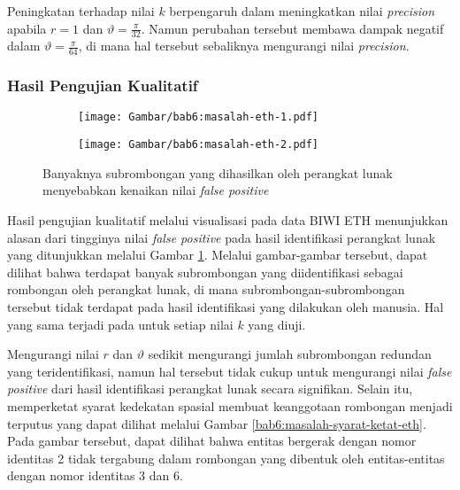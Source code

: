 Peningkatan terhadap nilai $k$ berpengaruh dalam meningkatkan nilai \textit{precision} apabila $r = 1$ dan $\vartheta = \frac{\pi}{32}$. Namun perubahan tersebut membawa dampak negatif dalam $\vartheta = \frac{\pi}{64}$, di mana hal tersebut sebaliknya mengurangi nilai \textit{precision}.

\subsubsection{Hasil Pengujian Kualitatif}
\label{subsubsec:eth-qualitative}

\begin{figure}[t]
    \centering
    \captionsetup{width=.65\textwidth}
    \begin{subfigure}[t]{0.3\textwidth}
        \centering
        \texttt{[image: Gambar/bab6:masalah-eth-1.pdf]}
    \end{subfigure}
    \begin{subfigure}[t]{0.3\textwidth}
        \centering
        \texttt{[image: Gambar/bab6:masalah-eth-2.pdf]}
    \end{subfigure}
    \caption[Subrombongan pada data BIWI ETH]{Banyaknya subrombongan yang dihasilkan oleh perangkat lunak menyebabkan kenaikan nilai \textit{false positive}}
    \label{bab6:masalah-eth}
\end{figure}

Hasil pengujian kualitatif melalui visualisasi pada data BIWI ETH menunjukkan alasan dari tingginya nilai \textit{false positive} pada hasil identifikasi perangkat lunak yang ditunjukkan melalui Gambar \ref{bab6:masalah-eth}. Melalui gambar-gambar tersebut, dapat dilihat bahwa terdapat banyak subrombongan yang diidentifikasi sebagai rombongan oleh perangkat lunak, di mana subrombongan-subrombongan tersebut tidak terdapat pada hasil identifikasi yang dilakukan oleh manusia. Hal yang sama terjadi pada untuk setiap nilai $k$ yang diuji.

Mengurangi nilai $r$ dan $\vartheta$ sedikit mengurangi jumlah subrombongan redundan yang teridentifikasi, namun hal tersebut tidak cukup untuk mengurangi nilai \textit{false positive} dari hasil identifikasi perangkat lunak secara signifikan. Selain itu, memperketat syarat kedekatan spasial membuat keanggotaan rombongan menjadi terputus yang dapat dilihat melalui Gambar \ref{bab6:masalah-syarat-ketat-eth}. Pada gambar tersebut, dapat dilihat bahwa entitas bergerak dengan nomor identitas 2 tidak tergabung dalam rombongan yang dibentuk oleh entitas-entitas dengan nomor identitas 3 dan 6.

